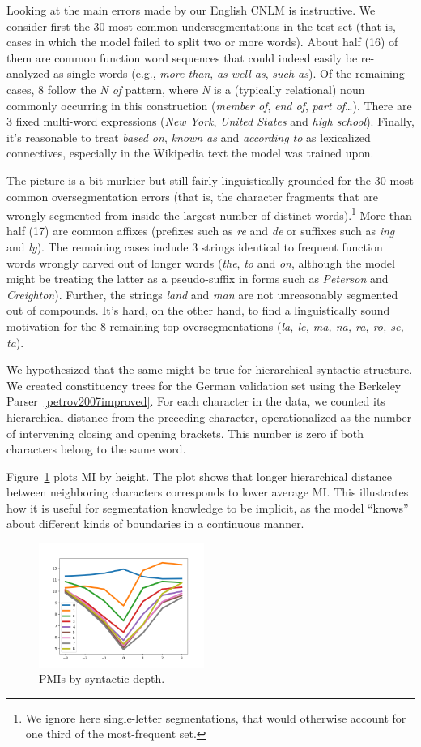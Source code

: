 Looking at the main errors made by our English CNLM is instructive. We
consider first the 30 most common undersegmentations in the test set
(that is, cases in which the model failed to split two or more
words). About half (16) of them are common function word sequences
that could indeed easily be re-analyzed as single words (e.g.,
\emph{more than}, \emph{as well as}, \emph{such as}). Of the remaining
cases, 8 follow the \emph{N of} pattern, where \emph{N} is a
(typically relational) noun commonly occurring in this construction
(\emph{member of}, \emph{end of}, \emph{part of}\ldots). There are 3
fixed multi-word expressions (\emph{New York}, \emph{United States}
and \emph{high school}). Finally, it's reasonable to treat \emph{based
  on}, \emph{known as} and \emph{according to} as lexicalized
connectives, especially in the Wikipedia text the model was trained
upon.

The picture is a bit murkier but still fairly linguistically grounded
for the 30 most common oversegmentation errors (that is, the character
fragments that are wrongly segmented from inside the largest number of
distinct words).\footnote{We ignore here single-letter segmentations,
  that would otherwise account for one third of the most-frequent
  set.}  More than half (17) are common affixes (prefixes such as
\emph{re} and \emph{de} or suffixes such as \emph{ing} and
\emph{ly}). The remaining cases include 3 strings identical to frequent
function words wrongly carved out of longer words (\emph{the},
\emph{to} and \emph{on}, although the model might be treating the
latter as a pseudo-suffix in forms such as \emph{Peterson} and
\emph{Creighton}). Further, the strings \emph{land} and \emph{man} are not
unreasonably segmented out of compounds. It's hard, on the other hand,
to find a linguistically sound motivation for the 8 remaining top
oversegmentations (\emph{la, le, ma, na, ra, ro, se, ta}).


We hypothesized that the same might be true for hierarchical syntactic structure.
We created constituency trees for the German validation set using the Berkeley Parser~\ref{petrov2007improved}.
For each character in the data, we counted its hierarchical distance from the preceding character, operationalized as the number of intervening closing and opening brackets.
This number is zero if both characters belong to the same word.

Figure~\ref{fig:syntax-depth} plots MI by height.
The plot shows that longer hierarchical distance between neighboring characters corresponds to lower average MI.
This illustrates how it is useful for segmentation knowledge to be implicit, as the model ``knows'' about different kinds of boundaries in a continuous manner.

\begin{figure}
\includegraphics[width=0.48\textwidth]{figures/segmentation-profile-pmis-german-all-heights.png}
\caption{PMIs by syntactic depth.}\label{fig:syntax-depth}
\end{figure}


